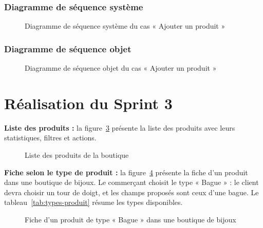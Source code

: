 \subsubsection{Diagramme de séquence système}
\begin{figure}[H]
    \centering
    \caption{Diagramme de séquence système du cas « Ajouter un produit »}
    \label{fig:dss-produit}
\end{figure}

\subsubsection{Diagramme de séquence objet}
\begin{figure}[H]
    \centering
    \caption{Diagramme de séquence objet du cas « Ajouter un produit »}
    \label{fig:dso-produit}
\end{figure}

\section{Réalisation du Sprint 3}
\textbf{Liste des produits :} la figure~\ref{fig:ui-produits} présente la liste des produits avec leurs statistiques, filtres et actions.
\begin{figure}[H]
    \centering
    \caption{Liste des produits de la boutique}
    \label{fig:ui-produits}
\end{figure}

\textbf{Fiche selon le type de produit :} la figure~\ref{fig:ui-types} présente la fiche d'un produit dans une boutique de bijoux. Le commerçant choisit le type « Bague » : le client devra choisir un tour de doigt, et les champs proposés sont ceux d'une bague. Le tableau~\ref{tab:types-produit} résume les types disponibles.
\begin{figure}[H]
    \centering
    \caption{Fiche d'un produit de type « Bague » dans une boutique de bijoux}
    \label{fig:ui-types}
\end{figure}

